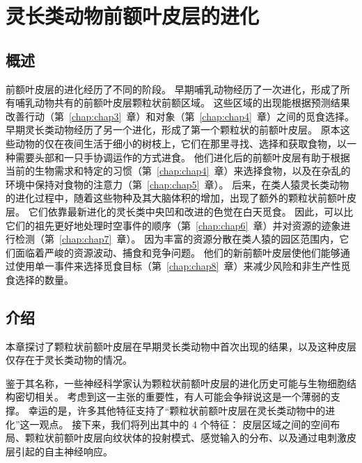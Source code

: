 \chapter{灵长类动物前额叶皮层的进化} \label{chap:chap2}


\section{概述}
前额叶皮层的进化经历了不同的阶段。
早期哺乳动物经历了一次进化，形成了所有哺乳动物共有的前额叶皮层颗粒状前额区域。
这些区域的出现能根据预测结果改善行动（第~\ref{chap:chap3}~章）和对象（第~\ref{chap:chap4}~章）之间的觅食选择。
早期灵长类动物经历了另一个进化，形成了第一个颗粒状的前额叶皮层。
原本这些动物的仅在夜间生活于细小的树枝上，它们在那里寻找、选择和获取食物，以一种需要头部和一只手协调运作的方式进食。
他们进化后的前额叶皮层有助于根据当前的生物需求和特定的习惯（第~\ref{chap:chap4}~章）来选择食物，以及在杂乱的环境中保持对食物的注意力（第~\ref{chap:chap5}~章）。
后来，在类人猿灵长类动物的进化过程中，随着这些物种及其大脑体积的增加，出现了额外的颗粒状前额叶皮层。
它们依靠最新进化的灵长类中央凹和改进的色觉在白天觅食。
因此，可以比它们的祖先更好地处理时空事件的顺序（第~\ref{chap:chap6}~章）并对资源的迹象进行检测（第~\ref{chap:chap7}~章）。
因为丰富的资源分散在类人猿的园区范围内，它们面临着严峻的资源波动、捕食和竞争问题。
他们的新前额叶皮层使他们能够通过使用单一事件来选择觅食目标（第~\ref{chap:chap8}~章）来减少风险和非生产性觅食选择的数量。




\section{介绍}

本章探讨了颗粒状前额叶皮层在早期灵长类动物中首次出现的结果，以及这种皮层仅存在于灵长类动物的情况\cite{preuss2007evolutionary}。


鉴于其名称，一些神经科学家认为颗粒状前额叶皮层的进化历史可能与生物细胞结构密切相关。
考虑到这一主张的重要性，有人可能会争辩说这是一个薄弱的支撑。
幸运的是，许多其他特征支持了“颗粒状前额叶皮层在灵长类动物中的进化”这一观点。
接下来，我们将列出其中的 4 个特征：
皮层区域之间的空间布局、颗粒状前额叶皮层向纹状体的投射模式、感觉输入的分布、以及通过电刺激皮层引起的自主神经响应。





